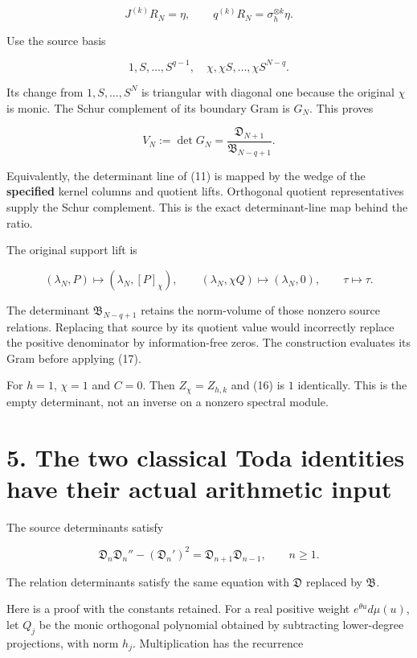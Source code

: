 \documentclass[
  11pt,
]{article}
\begin{document}
\[
J^{(k)}R_N=\eta,\qquad q^{(k)}R_N=\sigma_h^{\otimes k}\eta.
\]

Use the source basis

\[
1,S,\ldots,S^{q-1},\quad\chi,\chi S,\ldots,\chi S^{N-q}.
\]

Its change from \(1,S,\ldots,S^N\) is triangular with diagonal one
because the original \(\chi\) is monic. The Schur complement of its
boundary Gram is \(G_N\). This proves

\[
\boxed{V_N:=\det G_N=\frac{\mathfrak D_{N+1}}{\mathfrak B_{N-q+1}}.}
\tag{16}
\]

Equivalently, the determinant line of (11) is mapped by the wedge of the
\textbf{specified} kernel columns and quotient lifts. Orthogonal
quotient representatives supply the Schur complement. This is the exact
determinant-line map behind the ratio.

The original support lift is

\[
(\lambda_N,P)\longmapsto(\lambda_N,[P]_\chi),\qquad
(\lambda_N,\chi Q)\longmapsto(\lambda_N,0),\qquad \tau\longmapsto\tau.
\tag{17}
\]

The determinant \(\mathfrak B_{N-q+1}\) retains the norm-volume of those
nonzero source relations. Replacing that source by its quotient value
would incorrectly replace the positive denominator by information-free
zeros. The construction evaluates its Gram before applying (17).

For \(h=1\), \(\chi=1\) and \(C=0\). Then \(Z_\chi=Z_{h,k}\) and (16) is
\(1\) identically. This is the empty determinant, not an inverse on a
nonzero spectral module.

\section{5. The two classical Toda identities have their actual
arithmetic
input}\label{the-two-classical-toda-identities-have-their-actual-arithmetic-input}

The source determinants satisfy

\[
\boxed{
\mathfrak D_n\mathfrak D_n''-(\mathfrak D_n')^2
=\mathfrak D_{n+1}\mathfrak D_{n-1},\qquad n\ge1.
}
\tag{18}
\]

The relation determinants satisfy the same equation with \(\mathfrak D\)
replaced by \(\mathfrak B\).

Here is a proof with the constants retained. For a real positive weight
\(e^{\theta u}d\mu(u)\), let \(Q_j\) be the monic orthogonal polynomial
obtained by subtracting lower-degree projections, with norm \(h_j\).
Multiplication has the recurrence
\end{document}
